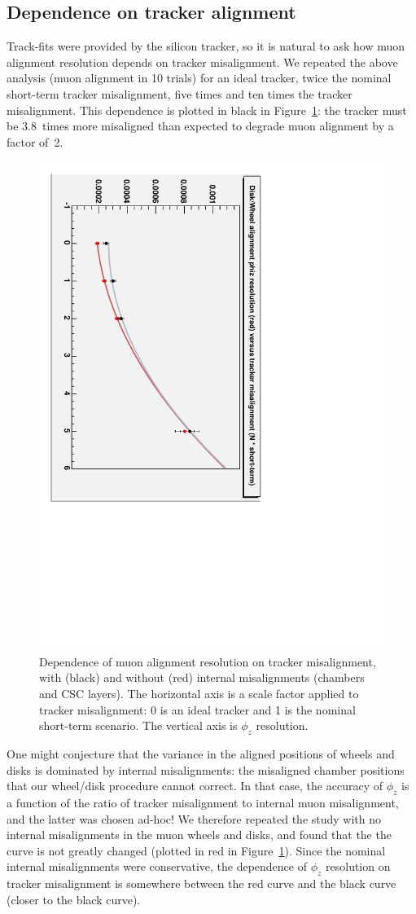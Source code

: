 \documentclass[12pt]{article}
\begin{document}
\subsection{Dependence on tracker alignment}

Track-fits were provided by the silicon tracker, so it is natural to
ask how muon alignment resolution depends on tracker misalignment.  We
repeated the above analysis (muon alignment in 10 trials) for an ideal
tracker, twice the nominal short-term tracker misalignment, five times
and ten times the tracker misalignment.  This dependence is plotted in
black in Figure~\ref{vstracker}: the tracker must be 3.8~times more
misaligned than expected to degrade muon alignment by a factor of~2.

\begin{figure}
\begin{center}
\includegraphics[height=0.75\linewidth, angle=90]{disk_alignment/vstracker2.pdf}
\end{center}

\caption{\label{vstracker} Dependence of muon alignment resolution on
  tracker misalignment, with (black) and without (red) internal
  misalignments (chambers and CSC layers).  The horizontal axis is a
  scale factor applied to tracker misalignment: 0 is an ideal tracker
  and 1 is the nominal short-term scenario.  The vertical axis is
  $\phi_z$ resolution.}
\end{figure}

One might conjecture that the variance in the aligned positions of
wheels and disks is dominated by internal misalignments: the
misaligned chamber positions that our wheel/disk procedure cannot
correct.  In that case, the accuracy of $\phi_z$ is a function of the
ratio of tracker misalignment to internal muon misalignment, and the
latter was chosen ad-hoc!  We therefore repeated the study with no
internal misalignments in the muon wheels and disks, and found that
the the curve is not greatly changed (plotted in red in
Figure~\ref{vstracker}).  Since the nominal internal misalignments
were conservative, the dependence of $\phi_z$ resolution on tracker
misalignment is somewhere between the red curve and the black curve
(closer to the black curve).
\end{document}
